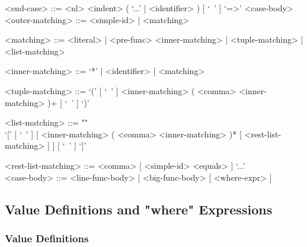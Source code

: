\documentclass{article}
\begin{document}
\begin{itemize}
\begin{grammar}
<end-case> ::=
<nl> <indent> ( `...' | <identifier> ) [ `\ ' ] `=>' <case-body>
\\

<outer-matching> ::= <simple-id> | <matching>

<matching> ::=
<literal> | <pre-func> <inner-matching> | <tuple-matching> | <list-matching>

<inner-matching> ::= `*' | <identifier> | <matching>

<tuple-matching> ::=
`(' [ `\ ' ] <inner-matching> ( <comma> <inner-matching> )+ [ `\ ' ] `)'

<list-matching> ::= ""\\
`[' [ `\ ' ]
[ <inner-matching> ( <comma> <inner-matching> )* [ <rest-list-matching> ] ]
[ `\ ' ] `]'

<rest-list-matching> ::= <comma> [ <simple-id> <equals> ] `...'
\\

<case-body> ::= <line-func-body> | <big-func-body> [ <where-expr> ]
\end{grammar}

\end{itemize}

\newpage

\subsection{Value Definitions and "where" Expressions}
\label{subsec:valdefswhere}

\subsubsection{Value Definitions}
\label{subsubsec:valdefs}
\end{document}
